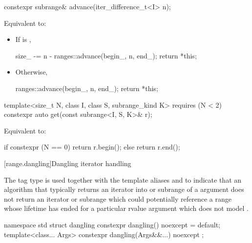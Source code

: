 %
\begin{itemdecl}
constexpr subrange& advance(iter_difference_t<I> n);
\end{itemdecl}

\begin{itemdescr}
\pnum
\effects Equivalent to:
\begin{itemize}
\item If  is ,
\begin{codeblock}
size_ -= n - ranges::advance(begin_, n, end_);
return *this;
\end{codeblock}
\item Otherwise,
\begin{codeblock}
ranges::advance(begin_, n, end_);
return *this;
\end{codeblock}
\end{itemize}
\end{itemdescr}

%
\begin{itemdecl}
template<size_t N, class I, class S, subrange_kind K>
  requires (N < 2)
constexpr auto get(const subrange<I, S, K>& r);
\end{itemdecl}

\begin{itemdescr}
\pnum
\effects Equivalent to:
\begin{codeblock}
if constexpr (N == 0)
  return r.begin();
else
  return r.end();
\end{codeblock}
\end{itemdescr}

[range.dangling]{Dangling iterator handling}

\pnum
The tag type  is used together
with the template aliases  and 
to indicate that an algorithm
that typically returns an iterator into or subrange of a  argument
does not return an iterator or subrange
which could potentially reference a range
whose lifetime has ended for a particular rvalue  argument
which does not model .
\begin{codeblock}
namespace std {
  struct dangling {
    constexpr dangling() noexcept = default;
  template<class... Args>
    constexpr dangling(Args&&...) noexcept { }
  };
}
\end{codeblock}

